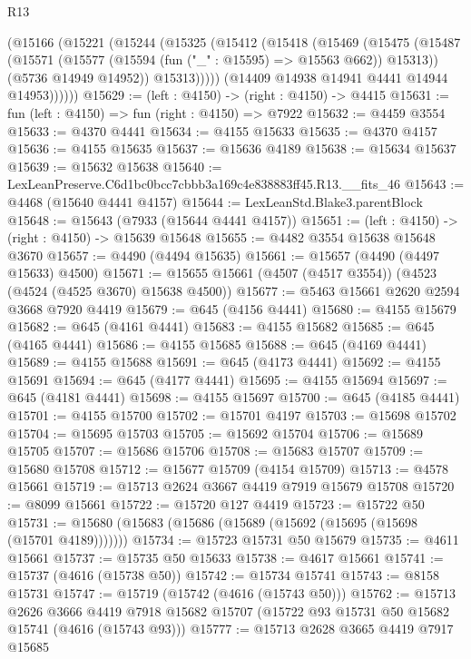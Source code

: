 \begin{lexlean}{R13}
\begin{coremodule}
        (@15166
          (@15221
            (@15244
              (@15325
                (@15412
                  (@15418
                    (@15469
                      (@15475
                        (@15487
                          (@15571 (@15577 (@15594 (fun ("_" : @15595) => @15563 @662)) @15313))
                          (@5736 @14949 @14952))
                        @15313)))))
              (@14409 @14938 @14941 @4441 @14944 @14953))))))
@15629 := (left : @4150) -> (right : @4150) -> @4415
@15631 := fun (left : @4150) => fun (right : @4150) => @7922
@15632 := @4459 @3554
@15633 := @4370 @4441
@15634 := @4155 @15633
@15635 := @4370 @4157
@15636 := @4155 @15635
@15637 := @15636 @4189
@15638 := @15634 @15637
@15639 := @15632 @15638
@15640 := LexLeanPreserve.C6d1bc0bcc7cbbb3a169c4e838883ff45.R13.__fits_46
@15643 := @4468 (@15640 @4441 @4157)
@15644 := LexLeanStd.Blake3.parentBlock
@15648 := @15643 (@7933 (@15644 @4441 @4157))
@15651 := (left : @4150) -> (right : @4150) -> @15639 @15648
@15655 := @4482 @3554 @15638 @15648 @3670
@15657 := @4490 (@4494 @15635)
@15661 := @15657 (@4490 (@4497 @15633) @4500)
@15671 := @15655 @15661 (@4507 (@4517 @3554)) (@4523 (@4524 (@4525 @3670) @15638 @4500))
@15677 := @5463 @15661 @2620 @2594 @3668 @7920 @4419
@15679 := @645 (@4156 @4441)
@15680 := @4155 @15679
@15682 := @645 (@4161 @4441)
@15683 := @4155 @15682
@15685 := @645 (@4165 @4441)
@15686 := @4155 @15685
@15688 := @645 (@4169 @4441)
@15689 := @4155 @15688
@15691 := @645 (@4173 @4441)
@15692 := @4155 @15691
@15694 := @645 (@4177 @4441)
@15695 := @4155 @15694
@15697 := @645 (@4181 @4441)
@15698 := @4155 @15697
@15700 := @645 (@4185 @4441)
@15701 := @4155 @15700
@15702 := @15701 @4197
@15703 := @15698 @15702
@15704 := @15695 @15703
@15705 := @15692 @15704
@15706 := @15689 @15705
@15707 := @15686 @15706
@15708 := @15683 @15707
@15709 := @15680 @15708
@15712 := @15677 @15709 (@4154 @15709)
@15713 := @4578 @15661
@15719 := @15713 @2624 @3667 @4419 @7919 @15679 @15708
@15720 := @8099 @15661
@15722 := @15720 @127 @4419
@15723 := @15722 @50
@15731 := @15680 (@15683 (@15686 (@15689 (@15692 (@15695 (@15698 (@15701 @4189)))))))
@15734 := @15723 @15731 @50 @15679
@15735 := @4611 @15661
@15737 := @15735 @50 @15633
@15738 := @4617 @15661
@15741 := @15737 (@4616 (@15738 @50))
@15742 := @15734 @15741
@15743 := @8158 @15731
@15747 := @15719 (@15742 (@4616 (@15743 @50)))
@15762 := @15713
    @2626
    @3666
    @4419
    @7918
    @15682
    @15707
    (@15722 @93 @15731 @50 @15682 @15741 (@4616 (@15743 @93)))
@15777 := @15713
    @2628
    @3665
    @4419
    @7917
    @15685

\end{coremodule}
\end{lexlean}
